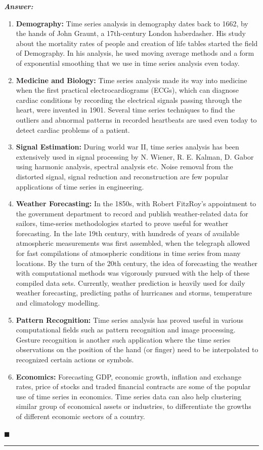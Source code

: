 \documentclass[12pt]{article}
\theoremstyle{definition}
\newenvironment{answer}{
    \textbf{\textit{Answer:}} \qquad
}{\hfill $\blacksquare$ \\ \begin{center}
    \rule{0.6\linewidth}{0.5px}    
\end{center}
}
\begin{document}
\begin{answer}
    \begin{enumerate}
        \item \textbf{Demography: } Time series analysis in demography dates back to 1662, by the hands of John Graunt, a 17th-century London haberdasher. His study about the mortality rates of people and creation of life tables started the field of Demography. In his analysis, he used moving average methods and a form of exponential smoothing that we use in time series analysis even today.
        \item \textbf{Medicine and Biology: } Time series analysis made its way into medicine when the first practical electrocardiograms (ECGs), which can diagnose cardiac conditions by recording the electrical signals passing through the heart, were invented in 1901. Several time series techniques to find the outliers and abnormal patterns in recorded heartbeats are used even today to detect cardiac problems of a patient.
        \item \textbf{Signal Estimation: } During world war II, time series analysis has been extensively used in signal processing by N. Wiener, R. E. Kalman, D. Gabor using harmonic analysis, spectral analysis etc. Noise removal from the distorted signal, signal reduction and reconstruction are few popular applications of time series in engineering.
        \item \textbf{Weather Forecasting: } In the 1850s, with Robert FitzRoy's appointment to the government department to record and publish weather-related data for sailors, time-series methodologies started to prove useful for weather forecasting. In the late 19th century, with hundreds of years of available atmospheric measurements was first assembled, when the telegraph allowed for fast compilations of atmospheric conditions in time series from many locations. By the turn of the 20th century, the idea of forecasting the weather with computational methods was vigorously pursued with the help of these compiled data sets. Currently, weather prediction is heavily used for daily weather forecasting, predicting paths of hurricanes and storms, temperature and climatology modelling.
        \item \textbf{Pattern Recognition: } Time series analysis has proved useful in various computational fields such as pattern recognition and image processing. Gesture recognition is another such application where the time series observations on the position of the hand (or finger) need to be interpolated to recognized certain actions or symbols.
        \item \textbf{Economics: } Forecasting GDP, economic growth, inflation and exchange rates, price of stocks and traded financial contracts are some of the popular use of time series in economics. Time series data can also help clustering similar group of economical assets or industries, to differentiate the growths of different economic sectors of a country.

\end{enumerate}
\end{answer}
\end{document}
